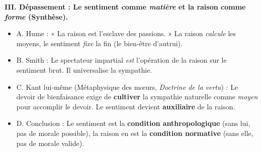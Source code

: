 \documentclass[11pt]{article}
\begin{document}
\begin{exoresolu}
\textbf{III. Dépassement : Le sentiment comme \emph{matière} et la raison comme \emph{forme} (Synthèse).}
\begin{itemize}
    \item A. Hume : « La raison est l'esclave des passions. » La raison \emph{calcule} les moyens, le sentiment \emph{fixe} la fin (le bien-être d'autrui).
    \item B. Smith : Le spectateur impartial \emph{est} l'opération de la raison sur le sentiment brut. Il universalise la sympathie.
    \item C. Kant lui-même (Métaphysique des mœurs, \emph{Doctrine de la vertu}) : Le devoir de bienfaisance exige de \textbf{cultiver} la sympathie naturelle comme \emph{moyen} pour accomplir le devoir. Le sentiment devient \textbf{auxiliaire} de la raison.
    \item D. Conclusion : Le sentiment est la \textbf{condition anthropologique} (sans lui, pas de morale possible), la raison en est la \textbf{condition normative} (sans elle, pas de morale valide).
\end{itemize}
\end{exoresolu}
\end{document}

